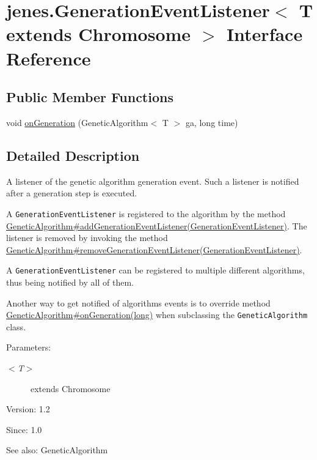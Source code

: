\hypertarget{interfacejenes_1_1_generation_event_listener_3_01_t_01extends_01_chromosome_01_4}{
\section{jenes.GenerationEventListener$<$ T extends Chromosome $>$ Interface Reference}
\label{interfacejenes_1_1_generation_event_listener_3_01_t_01extends_01_chromosome_01_4}
}
\subsection*{Public Member Functions}
\begin{CompactItemize}
\item 
void \hyperlink{interfacejenes_1_1_generation_event_listener_3_01_t_01extends_01_chromosome_01_4_ae224991bea21e4eca0f81ce0fb464e9}{onGeneration} (GeneticAlgorithm$<$ T $>$ ga, long time)
\end{CompactItemize}


\subsection{Detailed Description}
A listener of the genetic algorithm generation event. Such a listener is notified after a generation step is executed. 

A {\tt GenerationEventListener} is registered to the algorithm by the method \hyperlink{}{GeneticAlgorithm\#addGenerationEventListener(GenerationEventListener)}. The listener is removed by invoking the method \hyperlink{}{GeneticAlgorithm\#removeGenerationEventListener(GenerationEventListener)}.  

A {\tt GenerationEventListener} can be registered to multiple different algorithms, thus being notified by all of them. 

Another way to get notified of algorithms events is to override method \hyperlink{}{GeneticAlgorithm\#onGeneration(long)} when subclassing the {\tt GeneticAlgorithm} class. 

\begin{Desc}
\item[Parameters:]
\begin{description}
\item[{\em $<$T$>$}]extends Chromosome\end{description}
\end{Desc}
\begin{Desc}
\item[Version:]1.2 \end{Desc}
\begin{Desc}
\item[Since:]1.0\end{Desc}
\begin{Desc}
\item[See also:]GeneticAlgorithm \end{Desc}


